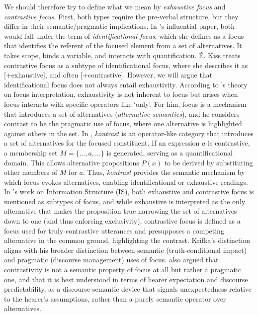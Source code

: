 \documentclass[ruler]{CUP-JNL-LIN}%
\begin{document}
We should therefore try to define what we mean by \textit{exhaustive focus} and \textit{contrastive focus}. First, both types require the pre-verbal structure, but they differ in their semantic/pragmatic implications. In \citet{ekiss_1998_identificational}'s influential paper, both would fall under the term of \textit{identificational focus}, which she defines as a focus that identifies the referent of the focused element from a set of alternatives. It takes scope, binds a variable, and interacts with quantification. É. Kiss treats contrastive focus as a subtype of identificational focus, where she describes it as [+exhaustive], and often [+contrastive]. However, we will argue that identificational focus does not always entail exhaustivity. 
According to \citet{rooth_1992_theory}'s theory on focus interpretation, exhaustivity is not inherent to focus but arises when focus interacts with specific operators like `only'. For him, focus is a mechanism that introduces a set of alternatives (\textit{alternative semantics}), and he considers contrast to be the pragmatic use of focus, where one alternative is highlighted against others in the set.
In \citet{vallduvi_1998_rheme}, \textit{kontrast} is an operator-like category that introduces a set of alternatives for the focused constituent. If an expression $a$ is contrastive, a membership set $M = \{\ldots,a,\ldots\}$ is generated, serving as a quantificational domain. This allows alternative propositions $P(x)$ to be derived by substituting other members of $M$ for $a$. Thus, \textit{kontrast} provides the semantic mechanism by which focus evokes alternatives, enabling identificational or exhaustive readings.
In \citet[259]{krifka_2008_basic}'s work on Information Structure (IS), both exhaustive and contrastive focus is mentioned as subtypes of focus, and while exhaustive is interpreted as the only alternative that makes the proposition true narrowing the set of alternatives down to one (and thus enforcing exclusivity), contrastive focus is defined as a focus used for truly contrastive utterances and presupposes a competing alternative in the common ground, highlighting the contrast. Krifka's distinction aligns with his broader distinction between semantic (truth‑conditional impact) and pragmatic (discourse management) uses of focus. 
\citet{zimmermann_2008_contrastive} also argued that contrastivity is not a semantic property of focus at all but rather a pragmatic one, and that it is best understood in terms of hearer expectation and discourse predictability, as a discourse‑semantic device that signals unexpectedness relative to the hearer’s assumptions, rather than a purely semantic operator over alternatives.
\end{document}

